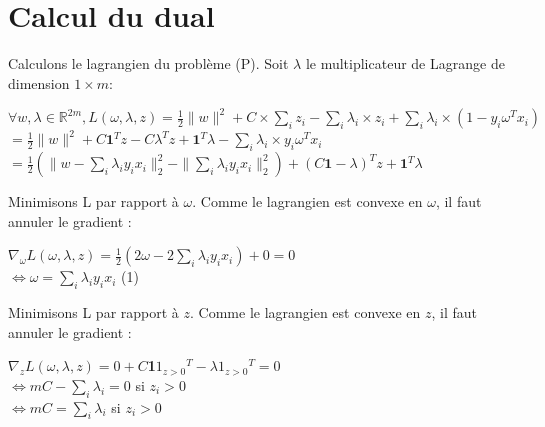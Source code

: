 \documentclass{article}
\begin{document}
\section{Calcul du dual}

Calculons le lagrangien du problème (P). Soit $\lambda$ le multiplicateur de Lagrange de dimension $1 \times m$:

              \begin{center}
              $
              \forall w, \lambda \in \mathbb{R}^{2m}, L(\omega, \lambda, z) 
              = \frac{1}{2} \|w\|^2 + C \times \sum_i z_i - \sum_i \lambda_i \times z_i
              + \sum_i \lambda_i \times (1 - y_i \omega^{T} x_i)$\\
              $= \frac{1}{2} \|w\|^2 + C\textbf{1}^{T}z - C\lambda^{T}z + \textbf{1}^{T}\lambda - \sum_i \lambda_i \times y_i \omega^{T} x_i$\\
              $= \frac{1}{2} (\|w - \sum_i \lambda_iy_ix_i\|^2_2 - \|\sum_i \lambda_iy_ix_i\|^2_2)
              + (C\textbf{1} - \lambda)^{T}z + \textbf{1}^{T}\lambda
              $
              \end{center}

Minimisons L par rapport à $\omega$. Comme le lagrangien est convexe en $\omega$, il faut annuler le gradient :\\

              \begin{center}
              $\nabla_{\omega} L(\omega, \lambda, z) = \frac{1}{2}(2\omega - 2\sum_i \lambda_iy_ix_i) + 0 = 0$\\
              $\Leftrightarrow \omega = \sum_i \lambda_iy_ix_i$ (1)\\
              \end{center}

Minimisons L par rapport à $z$. Comme le lagrangien est convexe en $z$, il faut annuler le gradient :\\

              \begin{center}
              $\nabla_{z} L(\omega, \lambda, z) = 0 + C$\textbf{1}\textbf{$1_{z>0}$}$^T - \lambda$\textbf{$1_{z>0}$}$^T = 0$\\
              $\Leftrightarrow mC - \sum_i \lambda_i = 0$ si $z_i > 0$\\
              $\Leftrightarrow mC = \sum_i \lambda_i$ si $z_i > 0$\\
              \end{center}
\end{document}

